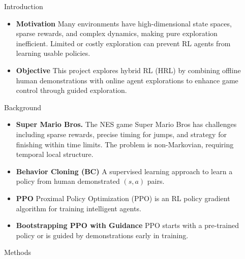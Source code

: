 \documentclass[final]{beamer}
\newlength{\sepwidth}
\newlength{\colwidth}
\newcommand{\separatorcolumn}{\begin{column}{\sepwidth}\end{column}}
\begin{document}
\begin{frame}[t]
\begin{columns}[t]
\separatorcolumn

\begin{column}{\colwidth}

  \begin{block}{Introduction}
    \begin{itemize}
        \item \textbf{Motivation} Many environments have high-dimensional state spaces, 
        sparse rewards, and complex dynamics, making pure exploration inefficient. 
        Limited or costly exploration can prevent RL agents from learning usable policies.
        \item \textbf{Objective} This project explores hybrid RL (HRL) by combining offline 
        human demonstrations with online agent explorations to enhance game control 
        through guided exploration.
    \end{itemize}
  \end{block}

  \begin{block}{Background}
    \begin{itemize}
      \item \textbf{Super Mario Bros.} The NES game 
      Super Mario Bros has challenges including sparse rewards, precise timing 
      for jumps, and strategy for finishing within time limits. 
      The problem is non-Markovian, requiring temporal local structure. 
      \item \textbf{Behavior Cloning (BC)} A supervised learning approach to learn 
      a policy from human demonstrated $(s,a)$ pairs.
      \item \textbf{PPO} Proximal Policy Optimization (PPO) is an RL policy 
      gradient algorithm for training intelligent agents.
      \item \textbf{Bootstrapping PPO with Guidance} PPO starts with a 
      pre-trained policy or is guided by demonstrations early in training.
    \end{itemize} 
  \end{block}
  
  \begin{block}{Methods}



\end{block}
\end{column}
\end{columns}
\end{frame}
\end{document}

